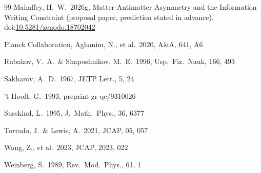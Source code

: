 \documentclass[12pt,a4paper]{article}
\begin{document}
\begin{thebibliography}{99}
Mahaffey, H.\ W.\ 2026g, Matter-Antimatter Asymmetry and the Information
Writing Constraint (proposal paper, prediction stated in advance).
doi:\href{https://doi.org/10.5281/zenodo.18702042}{10.5281/zenodo.18702042}

Planck Collaboration, Aghanim, N., et al.\ 2020, A\&A, 641, A6

Rubakov, V.\ A.\ \& Shaposhnikov, M.\ E.\ 1996, Usp.\ Fiz.\ Nauk, 166,
493

Sakharov, A.\ D.\ 1967, JETP Lett., 5, 24

't Hooft, G.\ 1993, preprint gr-qc/9310026

Susskind, L.\ 1995, J.\ Math.\ Phys., 36, 6377

Torrado, J.\ \& Lewis, A.\ 2021, JCAP, 05, 057

Wang, Z., et al.\ 2023, JCAP, 2023, 022

Weinberg, S.\ 1989, Rev.\ Mod.\ Phys., 61, 1

\end{thebibliography}
\end{document}
